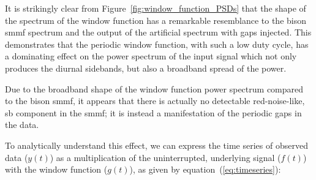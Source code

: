 
It is strikingly clear from Figure~\ref{fig:window_function_PSDs} that the shape of the spectrum of the window function has a remarkable resemblance to the \gls{bison} \gls{smmf} spectrum and the output of the artificial spectrum with gaps injected. This demonstrates that the periodic window function, with such a low duty cycle, has a dominating effect on the power spectrum of the input signal which not only produces the diurnal sidebands, but also a broadband spread of the power.

Due to the broadband shape of the window function power spectrum compared to the \gls{bison} \gls{smmf}, it appears that there is actually no detectable red-noise-like, \gls{sb} component in the \gls{smmf}; it is instead a manifestation of the periodic gaps in the data. %

To analytically understand this effect, we can express the time series of observed data ($y(t)$) as a multiplication of the uninterrupted, underlying signal ($f(t)$) with the window function ($g(t)$), as given by equation~(\ref{eq:timeseries}):


